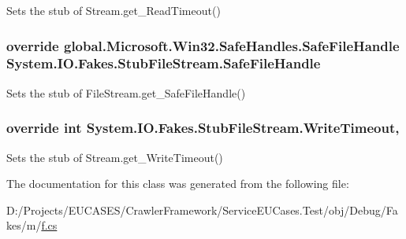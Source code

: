 Sets the stub of Stream.\-get\-\_\-\-Read\-Timeout()

\hypertarget{class_system_1_1_i_o_1_1_fakes_1_1_stub_file_stream_a8dc434afca10b8fd8af7205baf8b3060}{
\subsubsection[{Safe\-File\-Handle}]{\setlength{\rightskip}{0pt plus 5cm}override global.\-Microsoft.\-Win32.\-Safe\-Handles.\-Safe\-File\-Handle System.\-I\-O.\-Fakes.\-Stub\-File\-Stream.\-Safe\-File\-Handle\hspace{0.3cm}{\ttfamily [get]}}}\label{class_system_1_1_i_o_1_1_fakes_1_1_stub_file_stream_a8dc434afca10b8fd8af7205baf8b3060}


Sets the stub of File\-Stream.\-get\-\_\-\-Safe\-File\-Handle()

\hypertarget{class_system_1_1_i_o_1_1_fakes_1_1_stub_file_stream_ae96601dd93627a1937ba06320fc05565}{
\subsubsection[{Write\-Timeout}]{\setlength{\rightskip}{0pt plus 5cm}override int System.\-I\-O.\-Fakes.\-Stub\-File\-Stream.\-Write\-Timeout\hspace{0.3cm}{\ttfamily [get]}, {\ttfamily [set]}}}\label{class_system_1_1_i_o_1_1_fakes_1_1_stub_file_stream_ae96601dd93627a1937ba06320fc05565}


Sets the stub of Stream.\-get\-\_\-\-Write\-Timeout()



The documentation for this class was generated from the following file\-:\begin{DoxyCompactItemize}
\item 
D\-:/\-Projects/\-E\-U\-C\-A\-S\-E\-S/\-Crawler\-Framework/\-Service\-E\-U\-Cases.\-Test/obj/\-Debug/\-Fakes/m/\hyperlink{m_2f_8cs}{f.\-cs}\end{DoxyCompactItemize}
